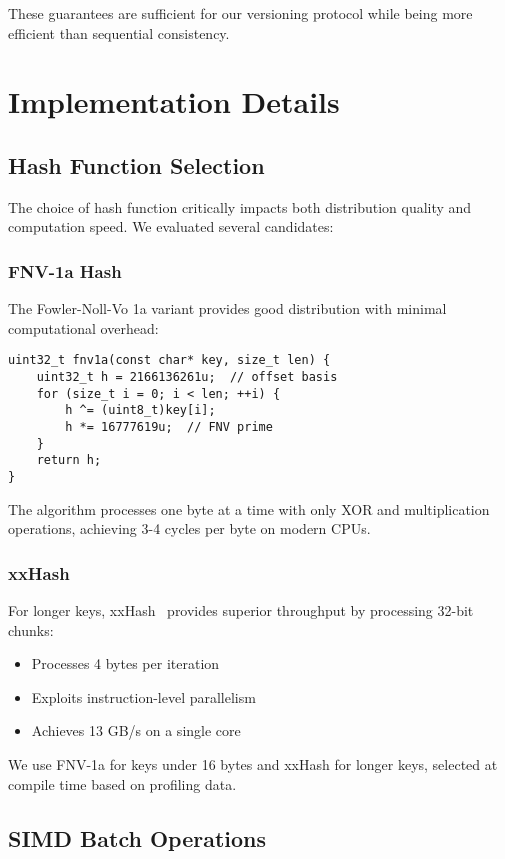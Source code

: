 \documentclass[10pt,conference]{IEEEtran}
\begin{document}
These guarantees are sufficient for our versioning protocol while being more efficient than sequential consistency.

\section{Implementation Details}
\label{sec:implementation}

\subsection{Hash Function Selection}

The choice of hash function critically impacts both distribution quality and computation speed. We evaluated several candidates:

\subsubsection{FNV-1a Hash}
The Fowler-Noll-Vo 1a variant provides good distribution with minimal computational overhead:

\begin{lstlisting}[caption={FNV-1a implementation},label={lst:fnv1a}]
uint32_t fnv1a(const char* key, size_t len) {
    uint32_t h = 2166136261u;  // offset basis
    for (size_t i = 0; i < len; ++i) {
        h ^= (uint8_t)key[i];
        h *= 16777619u;  // FNV prime
    }
    return h;
}
\end{lstlisting}

The algorithm processes one byte at a time with only XOR and multiplication operations, achieving 3-4 cycles per byte on modern CPUs.

\subsubsection{xxHash}
For longer keys, xxHash~\cite{xxhash} provides superior throughput by processing 32-bit chunks:
\begin{itemize}
\item Processes 4 bytes per iteration
\item Exploits instruction-level parallelism
\item Achieves 13 GB/s on a single core
\end{itemize}

We use FNV-1a for keys under 16 bytes and xxHash for longer keys, selected at compile time based on profiling data.

\subsection{SIMD Batch Operations}
\end{document}
